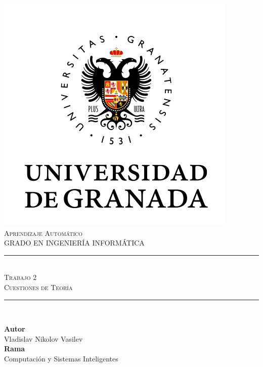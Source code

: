 \documentclass[11pt,a4paper]{article}
\newcommand{\asignatura}{Aprendizaje Automático}
\begin{document}

\begin{titlepage}

\begin{minipage}{\textwidth}

\centering

\includegraphics[scale=0.5]{img/ugr.png}\\

\textsc{\Large \asignatura{}\\[0.2cm]}
\textsc{GRADO EN INGENIERÍA INFORMÁTICA}\\[1cm]

\noindent\rule[-1ex]{\textwidth}{1pt}\\[1.5ex]
\textsc{{\Huge Trabajo 2\\[0.5ex]}}
\textsc{{\Large Cuestiones de Teoría\\}}
\noindent\rule[-1ex]{\textwidth}{2pt}\\[3.5ex]

\end{minipage}

\vspace{0.5cm}

\begin{minipage}{\textwidth}

\centering

\textbf{Autor}\\ {Vladislav Nikolov Vasilev}\\[2.5ex]
\textbf{Rama}\\ {Computación y Sistemas Inteligentes}\\[2.5ex]
\vspace{0.3cm}


\end{minipage}
\end{titlepage}
\end{document}
